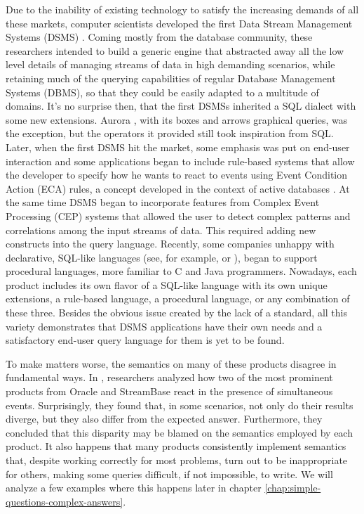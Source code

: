 Due to the inability of existing technology to satisfy the increasing
demands of all these markets, computer scientists developed the first
Data Stream Management Systems (DSMS) \cite{stream} \cite{aurora}
\cite{telegraphcq}. Coming mostly from the database community, these
researchers intended to build a generic engine that abstracted away
all the low level details of managing streams of data in high
demanding scenarios, while retaining much of the querying capabilities
of regular Database Management Systems (DBMS), so that they could be
easily adapted to a multitude of domains. It's no surprise then, that
the first DSMSs inherited a SQL dialect with some new
extensions. Aurora \cite{aurora}, with its boxes and arrows graphical
queries, was the exception, but the operators it provided still took
inspiration from SQL. Later, when the first DSMS hit the market, some
emphasis was put on end-user interaction and some applications began
to include rule-based systems that allow the developer to specify how
he wants to react to events using Event Condition Action (ECA) rules,
a concept developed in the context of active databases
\cite{adbms-manifesto}. At the same time DSMS began to incorporate
features from Complex Event Processing (CEP) systems that allowed the
user to detect complex patterns and correlations among the input
streams of data. This required adding new constructs into the query
language. Recently, some companies unhappy with declarative, SQL-like
languages (see, for example, \cite{sql-impendance-mismatch:post} or
\cite{flexstreams-whitepaper}), began to support procedural languages,
more familiar to C and Java programmers. Nowadays, each product
includes its own flavor of a SQL-like language with its own unique
extensions, a rule-based language, a procedural language, or any
combination of these three. Besides the obvious issue created by the
lack of a standard, all this variety demonstrates that DSMS
applications have their own needs and a satisfactory end-user query
language for them is yet to be found.

To make matters worse, the semantics on many of these products
disagree in fundamental ways. In \cite{towards_stream_sql_standard},
researchers analyzed how two of the most prominent products from
Oracle and StreamBase react in the presence of simultaneous
events. Surprisingly, they found that, in some scenarios, not only do
their results diverge, but they also differ from the expected
answer. Furthermore, they concluded that this disparity may be blamed
on the semantics employed by each product. It also happens that many
products consistently implement semantics that, despite working
correctly for most problems, turn out to be inappropriate for others,
making some queries difficult, if not impossible, to write. We will
analyze a few examples where this happens later in chapter
\ref{chap:simple-questions-complex-answers}.


